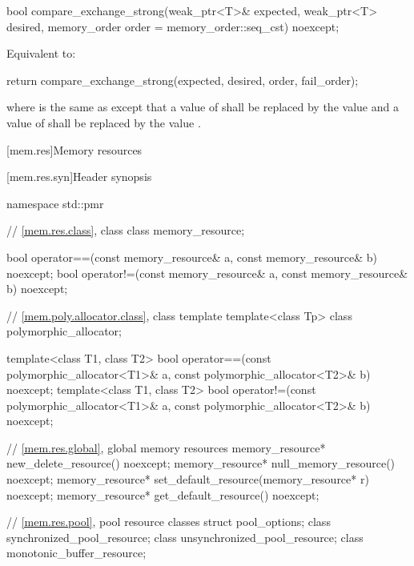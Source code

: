 %
\begin{itemdecl}
bool compare_exchange_strong(weak_ptr<T>& expected, weak_ptr<T> desired,
                             memory_order order = memory_order::seq_cst) noexcept;
\end{itemdecl}

\begin{itemdescr}
\pnum
\effects
Equivalent to:
\begin{codeblock}
return compare_exchange_strong(expected, desired, order, fail_order);
\end{codeblock}
where  is the same as 
except that a value of 
shall be replaced by the value  and
a value of 
shall be replaced by the value .
\end{itemdescr}

[mem.res]{Memory resources}

[mem.res.syn]{Header  synopsis}

%
\begin{codeblock}
namespace std::pmr {
  // \ref{mem.res.class}, class 
  class memory_resource;

  bool operator==(const memory_resource& a, const memory_resource& b) noexcept;
  bool operator!=(const memory_resource& a, const memory_resource& b) noexcept;

  // \ref{mem.poly.allocator.class}, class template 
  template<class Tp> class polymorphic_allocator;

  template<class T1, class T2>
    bool operator==(const polymorphic_allocator<T1>& a,
                    const polymorphic_allocator<T2>& b) noexcept;
  template<class T1, class T2>
    bool operator!=(const polymorphic_allocator<T1>& a,
                    const polymorphic_allocator<T2>& b) noexcept;

  // \ref{mem.res.global}, global memory resources
  memory_resource* new_delete_resource() noexcept;
  memory_resource* null_memory_resource() noexcept;
  memory_resource* set_default_resource(memory_resource* r) noexcept;
  memory_resource* get_default_resource() noexcept;

  // \ref{mem.res.pool}, pool resource classes
  struct pool_options;
  class synchronized_pool_resource;
  class unsynchronized_pool_resource;
  class monotonic_buffer_resource;
}
\end{codeblock}

